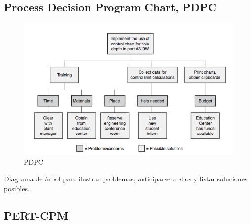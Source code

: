 \documentclass[]{article}
\begin{document}
\subsection{Process Decision Program Chart, PDPC}

\begin{figure}[ht!]
	\centering
	\includegraphics[width=120mm]{imagenes/PDPC.png}
	\caption{PDPC}
	\label{fig:PDPC}
\end{figure}

Diagrama de árbol para ilustrar problemas, anticiparse a ellos y listar soluciones posibles.

\subsection{PERT-CPM}
\end{document}
